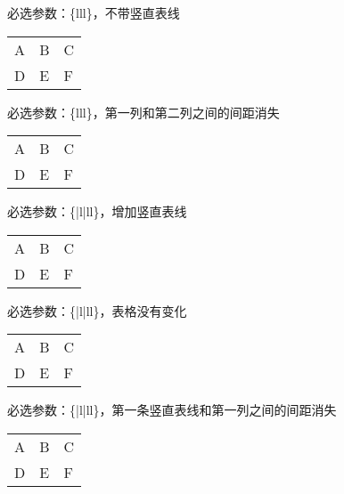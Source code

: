 ﻿\documentclass{article}
\begin{document}
    \mbox{}

    必选参数：\{lll\}，不带竖直表线

    \mbox{}

    \begin{tabular}{l@{}ll}
        \hline
        A&B&C\\
        D&E&F\\
        \hline
    \end{tabular}

    \mbox{}

    必选参数：\{l{}ll\}，第一列和第二列之间的间距消失

    \mbox{}

    \begin{tabular}{|l|ll}
        \hline
        A&B&C\\
        D&E&F\\
        \hline
    \end{tabular}

    \mbox{}
    
    必选参数：\{|l|ll\}，增加竖直表线

    \mbox{}

    \begin{tabular}{@{}|l|ll}
        \hline
        A&B&C\\
        D&E&F\\
        \hline
    \end{tabular}

    \mbox{}
    
    必选参数：\{{}|l|ll\}，表格没有变化

    \mbox{}

    \begin{tabular}{|@{}l|ll}
        \hline
        A&B&C\\
        D&E&F\\
        \hline
    \end{tabular}

    \mbox{}

    必选参数：\{|{}l|ll\}，第一条竖直表线和第一列之间的间距消失

    \mbox{}

    \begin{tabular}{|l@{}|ll}
        \hline
        A&B&C\\
        D&E&F\\
        \hline
    \end{tabular}

    \mbox{}
\end{document}
